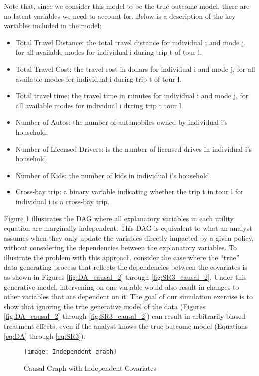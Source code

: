 Note that, since we consider this model to be the true outcome model, there are no latent variables we need to account for.
Below is a description of the key variables included in the model:

\begin{itemize}
  \item Total Travel Distance: the total travel distance for individual i and mode j, for all available modes for individual i during trip t of tour l.
  \item Total Travel Cost: the travel cost in dollars for individual i and mode j, for all available modes for individual i during trip t of tour l.
  \item Total travel time: the travel time in minutes for individual i and mode j, for all available modes for individual i during trip t tour l.
  \item Number of Autos: the number of automobiles owned by individual i's household.
  \item Number of Licensed Drivers: is the number of licensed drives in individual i's household.
  \item Number of Kids: the number of kids in individual i's household.
  \item Cross-bay trip: a binary variable indicating whether the trip t in tour l for individual i is a cross-bay trip.
\end{itemize}

Figure \ref{fig:IND_GRAPH} illustrates the DAG where all explanatory variables in each utility equation are marginally independent.
This DAG is equivalent to what an analyst assumes when they only update the variables directly impacted by a given policy, without considering the dependencies between the explanatory variables.
To illustrate the problem with this approach, consider the case where the ``true'' data generating process that reflects the dependencies between the covariates is as shown in Figures \ref{fig:DA_causal_2} through \ref{fig:SR3_causal_2}.
Under this generative model, intervening on one variable would also result in changes to other variables that are dependent on it.
The goal of our simulation exercise is to show that ignoring the true generative model of the data (Figures \ref{fig:DA_causal_2} through \ref{fig:SR3_causal_2}) can result in arbitrarily biased treatment effects, even if the analyst knows the true outcome model (Equations \ref{eq:DA} through \ref{eq:SR3}).

\begin{figure}
   \centering
   \texttt{[image: Independent\_graph]}
   \caption{Causal Graph with Independent Covariates}
   \label{fig:IND_GRAPH}
\end{figure}

